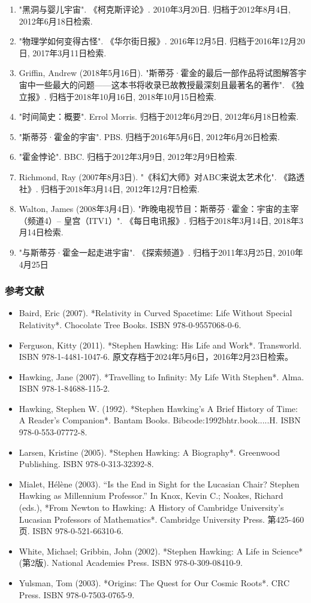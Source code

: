 \begin{enumerate}
\item "黑洞与婴儿宇宙". 《柯克斯评论》. 2010年3月20日. 归档于2012年8月4日, 2012年6月18日检索.
\item "物理学如何变得古怪". 《华尔街日报》. 2016年12月5日. 归档于2016年12月20日, 2017年3月11日检索.
\item Griffin, Andrew (2018年5月16日). "斯蒂芬·霍金的最后一部作品将试图解答宇宙中一些最大的问题——这本书将收录已故教授最深刻且最著名的著作". 《独立报》. 归档于2018年10月16日, 2018年10月15日检索.
\item "时间简史：概要". Errol Morris. 归档于2012年6月29日, 2012年6月18日检索.
\item "斯蒂芬·霍金的宇宙". PBS. 归档于2016年5月6日, 2012年6月26日检索.
\item "霍金悖论". BBC. 归档于2012年3月9日, 2012年2月9日检索.
\item Richmond, Ray (2007年8月3日). "《科幻大师》对ABC来说太艺术化". 《路透社》. 归档于2018年3月14日, 2012年12月7日检索.
\item Walton, James (2008年3月4日). "昨晚电视节目：斯蒂芬·霍金：宇宙的主宰（频道4）– 皇宫（ITV1）". 《每日电讯报》. 归档于2018年3月14日, 2018年3月14日检索.
\item "与斯蒂芬·霍金一起走进宇宙". 《探索频道》. 归档于2011年3月25日, 2010年4月25日
\end{enumerate}
\subsubsection{参考文献}
\begin{itemize}
\item Baird, Eric (2007). *Relativity in Curved Spacetime: Life Without Special Relativity*. Chocolate Tree Books. ISBN 978-0-9557068-0-6.
\item Ferguson, Kitty (2011). *Stephen Hawking: His Life and Work*. Transworld. ISBN 978-1-4481-1047-6. 原文存档于2024年5月6日，2016年2月23日检索。
\item Hawking, Jane (2007). *Travelling to Infinity: My Life With Stephen*. Alma. ISBN 978-1-84688-115-2.
\item Hawking, Stephen W. (1992). *Stephen Hawking's A Brief History of Time: A Reader's Companion*. Bantam Books. Bibcode:1992bhtr.book.....H. ISBN 978-0-553-07772-8.
\item Larsen, Kristine (2005). *Stephen Hawking: A Biography*. Greenwood Publishing. ISBN 978-0-313-32392-8.
\item Mialet, Hélène (2003). “Is the End in Sight for the Lucasian Chair? Stephen Hawking as Millennium Professor.” In Knox, Kevin C.; Noakes, Richard (eds.), *From Newton to Hawking: A History of Cambridge University's Lucasian Professors of Mathematics*. Cambridge University Press. 第425-460页. ISBN 978-0-521-66310-6.
\item White, Michael; Gribbin, John (2002). *Stephen Hawking: A Life in Science* (第2版). National Academies Press. ISBN 978-0-309-08410-9.
\item Yulsman, Tom (2003). *Origins: The Quest for Our Cosmic Roots*. CRC Press. ISBN 978-0-7503-0765-9.
\end{itemize}
